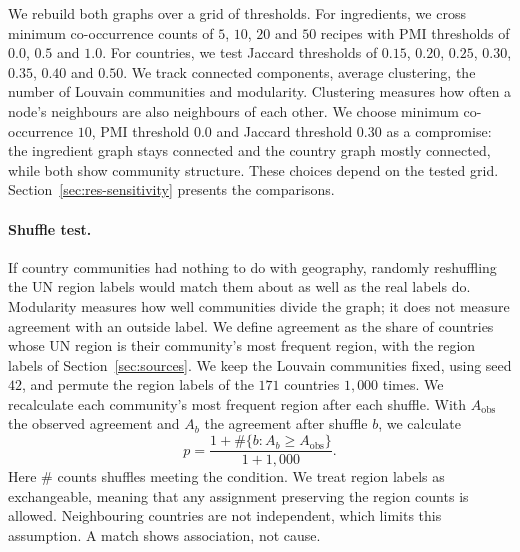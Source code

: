 We rebuild both graphs over a grid of thresholds. For ingredients, we cross
minimum co-occurrence counts of $5$, $10$, $20$ and $50$ recipes with PMI
thresholds of $0.0$, $0.5$ and $1.0$. For countries, we test Jaccard thresholds
of $0.15$, $0.20$, $0.25$, $0.30$, $0.35$, $0.40$ and $0.50$. We track connected
components, average clustering, the number of Louvain communities and
modularity. Clustering measures how often a node's neighbours are also
neighbours of each other. We choose minimum co-occurrence $10$, PMI threshold $0.0$ and
Jaccard threshold $0.30$ as a compromise: the ingredient graph stays
connected and the country graph mostly connected, while both show community
structure. These choices depend on the tested grid. Section~\ref{sec:res-sensitivity}
presents the comparisons.

\paragraph{Shuffle test.}
If country communities had nothing to do with geography, randomly
reshuffling the UN region labels would match them about as
well as the real labels do. Modularity measures how well communities divide
the graph; it does not measure agreement with an outside label. We define
agreement as the share of countries whose UN region is their community's
most frequent region, with the region labels of Section~\ref{sec:sources}. We keep the Louvain communities fixed, using seed
$42$, and permute the region labels of the $171$ countries $1{,}000$ times.
We recalculate each community's most frequent region after each shuffle.
With $A_{\mathrm{obs}}$ the observed agreement and $A_b$ the agreement after
shuffle $b$, we calculate
\[
p = \frac{1 + \#\{b : A_b \geq A_{\mathrm{obs}}\}}{1 + 1{,}000}.
\]
Here $\#$ counts shuffles meeting the condition. We treat region labels as
exchangeable, meaning that any assignment preserving the region counts is
allowed. Neighbouring countries are not independent, which limits this
assumption. A match shows association, not cause.
